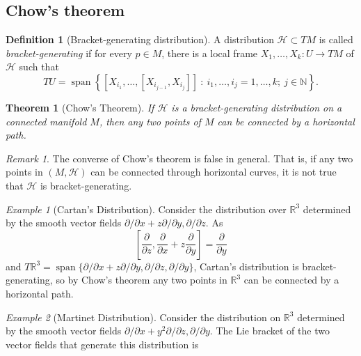\documentclass [xcolor=svgnames, t] {beamer}
\theoremstyle{definition}
\newtheorem{df}{Definition}
\theoremstyle{plain}
\newtheorem{thm}{Theorem}
\theoremstyle{remark}
\newtheorem{ex}{Example}
\newtheorem{rem}{Remark}
\begin{document}
\subsection{Chow's theorem}
\begin{frame}
	\begin{df}[Bracket-generating distribution]
	A distribution $ \mathcal{H}\subset TM $ is called \textit{bracket-generating} if for every $ p\in M $, there is a local frame $ X_1,\dots,X_k: U \rightarrow {TM} $ of $ \mathcal{H} $ such that 
	$$ TU = \operatorname{span}\left\{ [X_{i_1},\dots,[X_{i_{j-1}},X_{i_j}]]\ : \ i_1,\dots,i_j=1,\dots,k;\ j\in \mathbb{N} \right\}.  $$ 
\end{df}
\begin{thm}[Chow's Theorem]
	If $ \mathcal{H} $ is a bracket-generating distribution on a connected manifold $ M $, then any two points of $ M $ can be connected by a horizontal path.
\end{thm}
\begin{rem}
	The converse of Chow's theorem is false in general. That is, if any two points in $ (M,\mathcal{H}) $ can be connected through horizontal curves, it is not true that $ \mathcal{H} $ is bracket-generating. 
\end{rem}
\begin{ex}[Cartan's Distribution]\label{ex:cartan_distribution}
	Consider the distribution over $ \mathbb{R}^3 $ determined by the smooth vector fields $ \partial /\partial x + z \partial / \partial y, \partial/\partial z. $ As 
	$$ \left[ \frac{\partial}{\partial z}, \frac{\partial}{\partial x}+z \frac{\partial}{\partial y}    \right] = \frac{\partial}{\partial y}  $$ 
	and $ T \mathbb{R}^3 = \operatorname{span}\{  \partial/\partial x + z \partial / \partial y, \partial/\partial z, \partial/\partial y\} $, Cartan's distribution is bracket-generating, so by Chow's theorem any two points in $ \mathbb{R}^3 $ can be connected by a horizontal path.
\end{ex}
\begin{ex}[Martinet Distribution]
	Consider the distribution on $ \mathbb{R}^3 $ determined by the smooth vector fields $ \partial/\partial x+y^2\partial/\partial z, \partial/\partial y $. The Lie bracket of the two vector fields that generate this distribution is  


\end{ex}
\end{frame}
\end{document}
